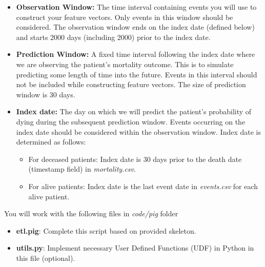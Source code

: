\documentclass[12pt]{article}
\begin{document}
\begin{itemize}
\item \textbf{Observation Window:} The time interval containing events you will use to construct your feature vectors. Only events in this window should be considered. The observation window ends on the index date (defined below) and starts 2000 days (including 2000) prior to the index date.
\item \textbf{Prediction Window:} A fixed time interval following the index date where we are observing the patient's mortality outcome. This is to simulate predicting some length of time into the future. Events in this interval should not be included while constructing feature vectors. The size of prediction window is 30 days.
\item \textbf{Index date:} The day on which we will predict the patient's probability of dying during the subsequent prediction window. Events occurring on the index date should be considered within the observation window. Index date is determined as follows:
\begin{itemize}
\item For deceased patients: Index date is 30 days prior to the death date (timestamp field) in \textit{mortality.csv}. 
\item For alive patients: Index date is the last event date in \textit{events.csv} for each alive patient. 
\end{itemize}
\end{itemize}

You will work with the following files in \textit{code/pig} folder
\begin{itemize}
\item \textbf{etl.pig}: Complete this script based on provided skeleton. 
\item \textbf{utils.py}: Implement necessary User Defined Functions (UDF) in Python in this file (optional).
\end{itemize}
\end{document}
